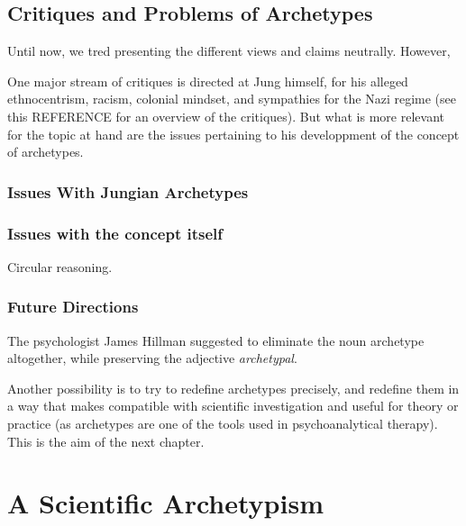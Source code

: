 \documentclass[
]{book}
\begin{document}
\hypertarget{critiques-and-problems-of-archetypes}{%
\section{Critiques and Problems of Archetypes}\label{critiques-and-problems-of-archetypes}}

Until now, we tred presenting the different views and claims neutrally. However,

One major stream of critiques is directed at Jung himself, for his alleged ethnocentrism, racism, colonial mindset, and sympathies for the Nazi regime (see this REFERENCE for an overview of the critiques). But what is more relevant for the topic at hand are the issues pertaining to his developpment of the concept of archetypes.

\hypertarget{issues-with-jungian-archetypes}{%
\subsection{Issues With Jungian Archetypes}\label{issues-with-jungian-archetypes}}

\hypertarget{issues-with-the-concept-itself}{%
\subsection{Issues with the concept itself}\label{issues-with-the-concept-itself}}

Circular reasoning.

\hypertarget{future-directions}{%
\subsection{Future Directions}\label{future-directions}}

The psychologist James Hillman suggested to eliminate the noun archetype altogether, while preserving the adjective \emph{archetypal}.

Another possibility is to try to redefine archetypes precisely, and redefine them in a way that makes compatible with scientific investigation and useful for theory or practice (as archetypes are one of the tools used in psychoanalytical therapy). This is the aim of the next chapter.

\hypertarget{a-scientific-archetypism}{%
\chapter{A Scientific Archetypism}\label{a-scientific-archetypism}}
\end{document}
